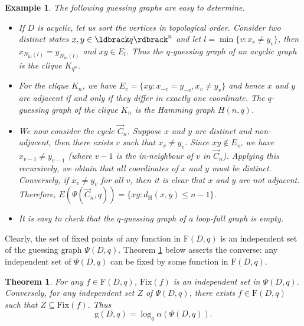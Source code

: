\documentclass[a4paper, 11pt]{book}
\numberwithin{equation}{section}
\theoremstyle{plain}
\newtheorem{theorem}	[equation]	{Theorem}
\newtheorem{example}	[equation]	{Example}
\newcommand{\neighbourhood}{N}
\newcommand{\inn}[1]{#1_\mathrm{in}}
\newcommand{\NIn}{\inn{\neighbourhood}}
\newcommand{\acyclic}{\alpha}
\newcommand{\independence}{\acyclic}
\newcommand{\functions}{\mathrm{F}}
\newcommand{\Fix}{\mathrm{Fix}}
\newcommand{\guessing}{\mathrm{g}}
\newcommand{\guessingGraph}{\Psi}
\newcommand{\dH}{d_\mathrm{H}}
\renewcommand{\(}{\ldbrack}
\renewcommand{\)}{\rdbrack}
\begin{document}
\begin{example} \label{ex:guessing_graph}
The following guessing graphs are easy to determine.
\begin{itemize}
	\item If $D$ is acyclic, let us sort the vertices in topological order. Consider two distinct states $x,y \in \(q\)^n$ and let $l = \min\{v : x_v \ne y_v \}$, then $x_{\NIn(l)} = y_{\NIn(l)}$ and $xy \in E_l$. Thus the $q$-guessing graph of an acyclic graph is the clique $K_{q^n}$.


	\item For the clique $K_n$, we have $E_v = \{xy: x_{- v} = y_{- v}, x_v \ne y_v \}$ and hence $x$ and $y$ are adjacent if and only if they differ in exactly one coordinate. The $q$-guessing graph of the clique $K_n$ is the Hamming graph $H(n,q)$.
	
	\item We now consider the cycle $\vec{C}_n$. Suppose $x$ and $y$ are distinct and non-adjacent, then there exists $v$ such that $x_v \ne y_v$. Since $xy \notin E_v$, we have $x_{v-1} \ne y_{v-1}$ (where $v-1$ is the in-neighbour of $v$ in $\vec{C}_n$). Applying this recursively, we obtain that all coordinates of $x$ and $y$ must be distinct. Conversely, if $x_v \ne y_v$ for all $v$, then it is clear that $x$ and $y$ are not adjacent. Therefore,
 $E(\guessingGraph(\vec{C}_n, q)) = \{xy: \dH(x,y) \le  n-1\}$.
	
	\item It is easy to check that the $q$-guessing graph of a loop-full graph is empty.
\end{itemize}
\end{example}


Clearly, the set of fixed points of any function in $\functions(D,q)$ is an independent set of the guessing graph $\guessingGraph(D,q)$. Theorem \ref{th:fixed_is_independent} below asserts the converse: any independent set of $\guessingGraph(D,q)$ can be fixed by some function in $\functions(D,q)$.

\begin{theorem} \label{th:fixed_is_independent}
For any $f \in \functions(D,q)$, $\Fix(f)$ is an independent set in $\guessingGraph(D,q)$. Conversely, for any independent set $Z$ of $\guessingGraph(D,q)$, there exists $f \in \functions(D,q)$ such that $Z \subseteq \Fix(f)$. Thus
\begin{equation} \nonumber
	\guessing(D,q) = \log_q \independence(\guessingGraph(D,q)).
\end{equation}
\end{theorem}
\end{document}
